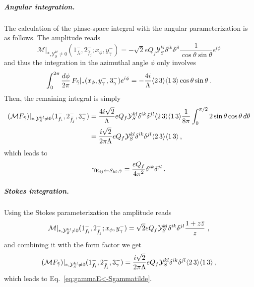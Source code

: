 \subparagraph{Angular integration.}
The calculation of the phase-space integral with the angular parameterization is as follows.
The amplitude reads
\begin{equation}
    \mathcal M|_{*,\mathcal Y_S^{kl}\neq 0}(1^-_{f_i},2^-_{\bar f_j};x_\phi,y^-_\gamma) =  -\sqrt 2 eQ_f \mathcal Y_S^{kl}\delta^{ik}\delta^{jl} \frac{1}{\cos\theta \sin\theta}e^{i\phi}
\end{equation}
and thus the integration in the azimuthal angle $\phi$ only involves
\begin{equation}
    \int_0^{2\pi}\frac{d\phi}{2\pi}\,F_{\tilde\gamma}|_*(x_\phi,y^-_\gamma,3_\gamma^-)e^{i\phi} = - \frac{4i}{\Lambda}\langle2\, 3 \rangle\langle1\, 3 \rangle\cos\theta\sin\theta\,.
\end{equation}
Then, the remaining integral is simply
\begin{align}
    (\mathcal M F_{\tilde\gamma})|_{*,\mathcal Y_S^{kl}\neq 0}(1^-_{f_i},2^-_{\bar f_j},3^-_\gamma) &=  \frac{4 i\sqrt 2}{\Lambda}  eQ_f \mathcal Y_S^{kl}\delta^{ik}\delta^{jl}  \langle2\, 3 \rangle\langle1\, 3 \rangle \frac{1}{8\pi}\int_0^{\pi/2}2\sin\theta\cos\theta\,d\theta \nonumber \\
    &=  \frac{ i\sqrt 2}{2\pi\Lambda}  eQ_f \mathcal Y_S^{kl}\delta^{ik}\delta^{jl}  \langle2\, 3 \rangle\langle1\, 3 \rangle\,,
\end{align}
which leads to
\begin{equation}\label{eq:gammaE<-Sgammatilde}
    \gamma_{\textup{E}_{ij}\leftarrow S_{kl},\tilde\gamma} =  \frac{eQ_f }{4\pi^2}\delta^{ik}\delta^{jl}\,.
\end{equation}

\subparagraph{Stokes integration.}
Using the Stokes parameterization the amplitude reads
\begin{equation}
    \mathcal M|_{*,\mathcal Y_S^{kl}\neq 0}(1^-_{f_i},2^-_{\bar f_j};x_\phi,y^-_\gamma) =  \sqrt 2 eQ_f \mathcal Y_S^{kl}\delta^{ik}\delta^{jl} \frac{1+z \bar{z}}{z} \ , 
\end{equation}
and combining it with the form factor we get
\begin{equation}
    (\mathcal M F_{\tilde\gamma})|_{*,\mathcal Y_S^{kl}\neq 0}(1^-_{f_i},2^-_{\bar f_j},3^-_\gamma)
    =  \frac{ i\sqrt 2}{2\pi\Lambda}  eQ_f \mathcal Y_S^{kl}\delta^{ik}\delta^{jl}  \langle2\, 3 \rangle\langle1\, 3 \rangle\,,
\end{equation}
which leads to Eq.~\eqref{eq:gammaE<-Sgammatilde}.

